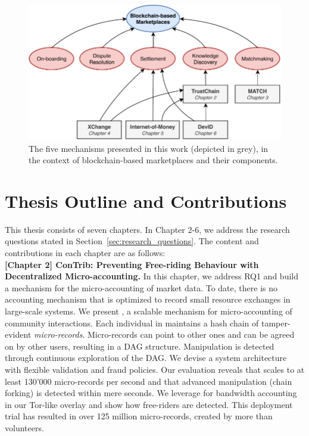 

\begin{figure}[t]
	\centering
	\includegraphics[width=\linewidth]{introduction/assets/thesis_overview}
	\caption{The five mechanisms presented in this work (depicted in grey), in the context of blockchain-based marketplaces and their components.}
	\label{fig:thesis_overview}
\end{figure}

\section{Thesis Outline and Contributions}
This thesis consists of seven chapters.
In Chapter 2-6, we address the research questions stated in Section~\ref{sec:research_questions}.
The content and contributions in each chapter are as follows:\\

\textbf{[Chapter 2] ConTrib: Preventing Free-riding Behaviour with Decentralized Micro-accounting.}
In this chapter, we address RQ1 and build a mechanism for the micro-accounting of market data.
To date, there is no accounting mechanism that is optimized to record small resource exchanges in large-scale systems.
We present \ModelName{}, a scalable mechanism for micro-accounting of community interactions.
Each individual in \ModelName{} maintains a hash chain of tamper-evident \emph{micro-records}.
Micro-records can point to other ones and can be agreed on by other users, resulting in a DAG structure.
Manipulation is detected through continuous exploration of the DAG.
We devise a system architecture with flexible validation and fraud policies.
Our evaluation reveals that \ModelName{} scales to at least 130'000 micro-records per second and that advanced manipulation (chain forking) is detected within mere seconds.
We leverage \ModelName{} for bandwidth accounting in our Tor-like overlay and show how free-riders are detected.
This deployment trial has resulted in over 125 million micro-records, created by more than \TrialUsers{} volunteers.

